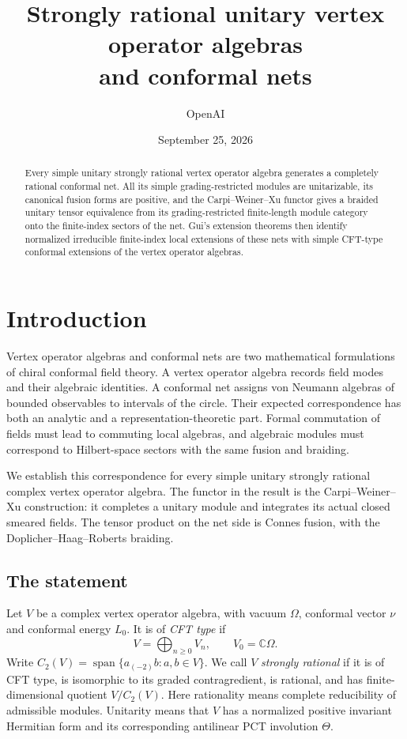 \documentclass[11pt]{article}
\title{Strongly rational unitary vertex operator algebras\\ and conformal nets}
\author{OpenAI}
\date{September 25, 2026}
\numberwithin{equation}{section}
\theoremstyle{definition}
\theoremstyle{remark}
\begin{document}
\maketitle
\begin{abstract}
Every simple unitary strongly rational vertex operator algebra generates a completely rational conformal net. All its simple grading-restricted modules are unitarizable, its canonical fusion forms are positive, and the Carpi--Weiner--Xu functor gives a braided unitary tensor equivalence from its grading-restricted finite-length module category onto the finite-index sectors of the net. Gui's extension theorems then identify normalized irreducible finite-index local extensions of these nets with simple CFT-type conformal extensions of the vertex operator algebras.
\end{abstract}
\tableofcontents

\section{Introduction}\label{sec:introduction}

Vertex operator algebras and conformal nets are two mathematical formulations of chiral conformal field theory. A vertex operator algebra records field modes and their algebraic identities. A conformal net assigns von Neumann algebras of bounded observables to intervals of the circle. Their expected correspondence has both an analytic and a representation-theoretic part. Formal commutation of fields must lead to commuting local algebras, and algebraic modules must correspond to Hilbert-space sectors with the same fusion and braiding.

We establish this correspondence for every simple unitary strongly rational complex vertex operator algebra. The functor in the result is the Carpi--Weiner--Xu construction: it completes a unitary module and integrates its actual closed smeared fields. The tensor product on the net side is Connes fusion, with the Doplicher--Haag--Roberts braiding.

\subsection{The statement}

Let $V$ be a complex vertex operator algebra, with vacuum $\Omega$, conformal vector $\nu$ and conformal energy $L_0$. It is of \emph{CFT type} if
\[
 V=\bigoplus_{n\geq0}V_n,\qquad V_0=\mathbb C\Omega.
\]
Write $C_2(V)=\operatorname{span}\{a_{(-2)}b:a,b\in V\}$. We call $V$ \emph{strongly rational} if it is of CFT type, is isomorphic to its graded contragredient, is rational, and has finite-dimensional quotient $V/C_2(V)$. Here rationality means complete reducibility of admissible modules. Unitarity means that $V$ has a normalized positive invariant Hermitian form and its corresponding antilinear PCT involution $\Theta$.
\end{document}
